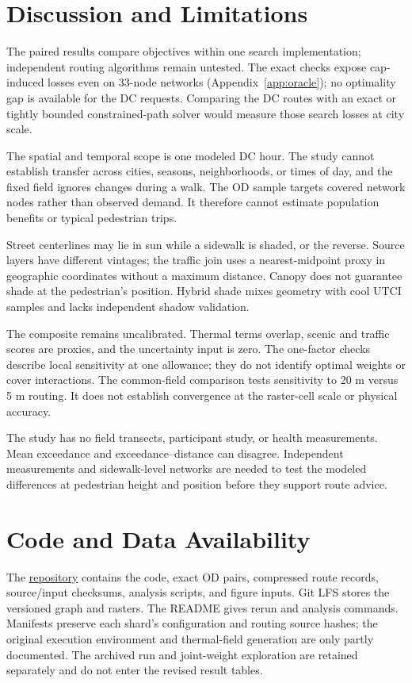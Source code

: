 \documentclass[sigconf,nonacm]{acmart}
\begin{document}
\section{Discussion and Limitations}
The paired results compare objectives within one search implementation; independent routing algorithms remain untested. The exact checks expose cap-induced losses even on 33-node networks (Appendix~\ref{app:oracle}); no optimality gap is available for the DC requests. Comparing the DC routes with an exact or tightly bounded constrained-path solver would measure those search losses at city scale.

The spatial and temporal scope is one modeled DC hour. The study cannot establish transfer across cities, seasons, neighborhoods, or times of day, and the fixed field ignores changes during a walk. The OD sample targets covered network nodes rather than observed demand. It therefore cannot estimate population benefits or typical pedestrian trips.

Street centerlines may lie in sun while a sidewalk is shaded, or the reverse. Source layers have different vintages; the traffic join uses a nearest-midpoint proxy in geographic coordinates without a maximum distance. Canopy does not guarantee shade at the pedestrian's position. Hybrid shade mixes geometry with cool UTCI samples and lacks independent shadow validation.

The composite remains uncalibrated. Thermal terms overlap, scenic and traffic scores are proxies, and the uncertainty input is zero. The one-factor checks describe local sensitivity at one allowance; they do not identify optimal weights or cover interactions. The common-field comparison tests sensitivity to 20 m versus 5 m routing. It does not establish convergence at the raster-cell scale or physical accuracy.

The study has no field transects, participant study, or health measurements. Mean exceedance and exceedance--distance can disagree. Independent measurements and sidewalk-level networks are needed to test the modeled differences at pedestrian height and position before they support route advice.

\section*{Code and Data Availability}
The \href{https://github.com/kameronlee/Routing/tree/\ArtifactCommit}{repository} contains the code, exact OD pairs, compressed route records, source/input checksums, analysis scripts, and figure inputs. Git LFS stores the versioned graph and rasters. The README gives rerun and analysis commands. Manifests preserve each shard's configuration and routing source hashes; the original execution environment and thermal-field generation are only partly documented. The archived run and joint-weight exploration are retained separately and do not enter the revised result tables.
\end{document}
